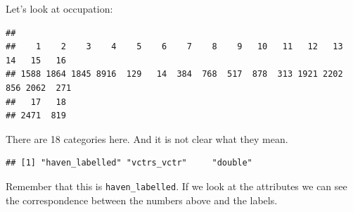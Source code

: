 \documentclass[
]{book}
\newenvironment{Shaded}{\begin{snugshade}}{\end{snugshade}}
\newcommand{\FunctionTok}[1]{\textcolor[rgb]{0.00,0.00,0.00}{#1}}
\newcommand{\NormalTok}[1]{#1}
\newcommand{\SpecialCharTok}[1]{\textcolor[rgb]{0.00,0.00,0.00}{#1}}
\begin{document}
Let's look at occupation:

\begin{Shaded}
\end{Shaded}

\begin{verbatim}
## 
##    1    2    3    4    5    6    7    8    9   10   11   12   13   14   15   16 
## 1588 1864 1845 8916  129   14  384  768  517  878  313 1921 2202  856 2062  271 
##   17   18 
## 2471  819
\end{verbatim}

There are 18 categories here. And it is not clear what they mean.

\begin{Shaded}
\end{Shaded}

\begin{verbatim}
## [1] "haven_labelled" "vctrs_vctr"     "double"
\end{verbatim}

Remember that this is \texttt{haven\_labelled}. If we look at the attributes we can see the correspondence between the numbers above and the labels.

\begin{Shaded}
\end{Shaded}
\end{document}
